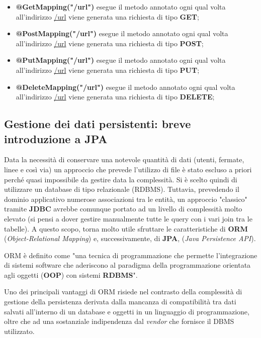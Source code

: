         \begin{itemize}
            \item \textbf{@GetMapping("/url")} esegue il metodo annotato ogni qual volta all'indirizzo \url{/url} viene generata una richiesta di tipo \textbf{GET};
            \item \textbf{@PostMapping("/url")} esegue il metodo annotato ogni qual volta all'indirizzo \url{/url} viene generata una richiesta di tipo \textbf{POST};
            \item \textbf{@PutMapping("/url")} esegue il metodo annotato ogni qual volta all'indirizzo \url{/url} viene generata una richiesta di tipo \textbf{PUT};
            \item \textbf{@DeleteMapping("/url")} esegue il metodo annotato ogni qual volta all'indirizzo \url{/url} viene generata una richiesta di tipo \textbf{DELETE};
        \end{itemize}

    \subsection{Gestione dei dati persistenti: breve introduzione a JPA}
        Data la necessità di conservare una notevole quantità di dati (utenti, fermate, linee e così via) un approccio che prevede l'utilizzo di file è stato escluso a priori perché quasi impossibile da gestire data la complessità. Si è scelto quindi di utilizzare un database di tipo relazionale (RDBMS). Tuttavia, prevedendo il dominio applicativo numerose associazioni tra le entità, un approccio "classico" tramite \textbf{JDBC} avrebbe comunque portato ad un livello di complessità molto elevato (si pensi a dover gestire manualmente tutte le query con i vari join tra le tabelle). A questo scopo, torna molto utile sfruttare le caratteristiche di \textbf{ORM} (\textit{Object-Relational Mapping}) e, successivamente, di \textbf{JPA}, (\textit{Java Persistence API}).
        
        ORM è definito come "una tecnica di programmazione che permette l'integrazione di sistemi software che aderiscono al paradigma della programmazione orientata agli oggetti (\textbf{OOP}) con sistemi \textbf{RDBMS}".

        Uno dei principali vantaggi di ORM risiede nel contrasto della complessità di gestione della persistenza derivata dalla mancanza di compatibilità tra dati salvati all'interno di un database e oggetti in un linguaggio di programmazione, oltre che ad una sostanziale indipendenza dal \textit{vendor} che fornisce il DBMS utilizzato. \cite{wiki:orm}
        
